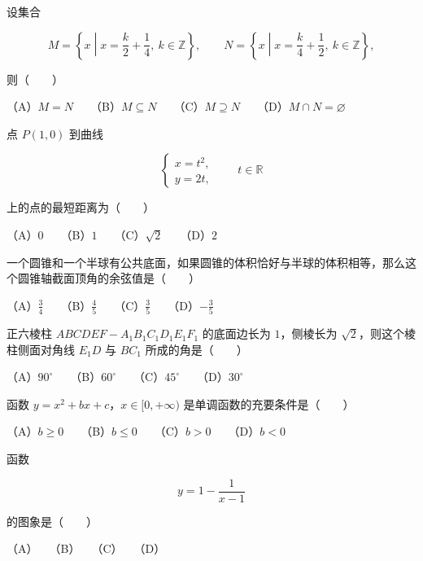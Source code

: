 \begin{question}
设集合

\nopagebreak[4]
\[
M=\left\{x\middle|x=\frac{k}{2}+\frac14,\ k\in\mathbb Z\right\},\qquad
N=\left\{x\middle|x=\frac{k}{4}+\frac12,\ k\in\mathbb Z\right\},
\]

则\mbox{（　　）}

（A）$M=N$　　（B）$M\subseteq N$　　（C）$M\supseteq N$　　（D）$M\cap N=\varnothing$

\end{question}
\begin{question}
点 $P(1,0)$ 到曲线

\nopagebreak[4]
\[
\begin{cases}
x=t^2,\\
y=2t,
\end{cases}
\qquad t\in\mathbb R
\]

上的点的最短距离为\mbox{（　　）}

（A）$0$　　（B）$1$　　（C）$\sqrt2$　　（D）$2$

\end{question}
\begin{question}
一个圆锥和一个半球有公共底面，如果圆锥的体积恰好与半球的体积相等，那么这个圆锥轴截面顶角的余弦值是\mbox{（　　）}

（A）$\frac34$　　（B）$\frac45$　　（C）$\frac35$　　（D）$-\frac35$

\end{question}
\begin{question}
正六棱柱 $ABCDEF-A_1B_1C_1D_1E_1F_1$ 的底面边长为 $1$，侧棱长为 $\sqrt2$，则这个棱柱侧面对角线 $E_1D$ 与 $BC_1$ 所成的角是\mbox{（　　）}

（A）$90^\circ$　　（B）$60^\circ$　　（C）$45^\circ$　　（D）$30^\circ$

\end{question}
\begin{question}
函数 $y=x^2+bx+c$，$x\in[0,+\infty)$ 是单调函数的充要条件是\mbox{（　　）}

（A）$b\geqslant0$　　（B）$b\leqslant0$　　（C）$b>0$　　（D）$b<0$

\Needspace{0.4\textheight}
\end{question}
\begin{question}
函数

\nopagebreak[4]
\[
y=1-\frac{1}{x-1}
\]

的图象是\mbox{（　　）}
\nopagebreak[4]
\begin{center}\end{center}
\nopagebreak[4]
（A）　　（B）　　（C）　　（D）

\end{question}
